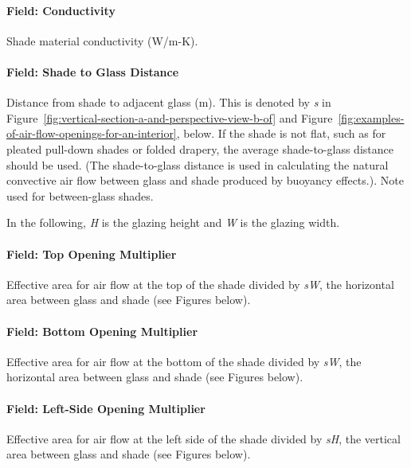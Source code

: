 \paragraph{Field: Conductivity}\label{field-conductivity-3}

Shade material conductivity (W/m-K).

\paragraph{Field: Shade to Glass Distance}\label{field-shade-to-glass-distance}

Distance from shade to adjacent glass (m). This is denoted by \emph{s} in Figure~\ref{fig:vertical-section-a-and-perspective-view-b-of} and Figure~\ref{fig:examples-of-air-flow-openings-for-an-interior}, below. If the shade is not flat, such as for pleated pull-down shades or folded drapery, the average shade-to-glass distance should be used. (The shade-to-glass distance is used in calculating the natural convective air flow between glass and shade produced by buoyancy effects.). Note used for between-glass shades.

In the following, \emph{H} is the glazing height and \emph{W} is the glazing width.

\paragraph{Field: Top Opening Multiplier}\label{field-top-opening-multiplier}

Effective area for air flow at the top of the shade divided by \emph{sW}, the horizontal area between glass and shade (see Figures below).

\paragraph{Field: Bottom Opening Multiplier}\label{field-bottom-opening-multiplier}

Effective area for air flow at the bottom of the shade divided by \emph{sW}, the horizontal area between glass and shade (see Figures below).

\paragraph{Field: Left-Side Opening Multiplier}\label{field-left-side-opening-multiplier}

Effective area for air flow at the left side of the shade divided by \emph{sH}, the vertical area between glass and shade (see Figures below).


